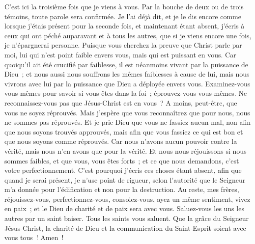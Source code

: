 \begin{multicols}{2}
\VerseOne{}C'est ici la troisième fois que je viens à vous. Par la bouche de deux ou de trois témoins, toute parole sera confirmée.
Je l'ai déjà dit, et je le dis encore comme lorsque j'étais présent pour la seconde fois, et maintenant étant absent, j'écris à ceux qui ont péché auparavant et à tous les autres, que si je viens encore une fois, je n'épargnerai personne.
Puisque vous cherchez la preuve que Christ parle par moi, lui qui n'est point faible envers vous, mais qui est puissant en vous.
Car quoiqu'il ait été crucifié par faiblesse, il est néanmoins vivant par la puissance de Dieu~; et nous aussi nous souffrons les mêmes faiblesses à cause de lui, mais nous vivrons avec lui par la puissance que Dieu a déployée envers vous.
Examinez-vous vous-mêmes pour savoir si vous êtes dans la foi~; éprouvez-vous vous-mêmes. Ne reconnaissez-vous pas que Jésus-Christ est en vous~? A moins, peut-être, que vous ne soyez réprouvés.
Mais j'espère que vous reconnaîtrez que pour nous, nous ne sommes pas réprouvés.
Et je prie Dieu que vous ne fassiez aucun mal, non afin que nous soyons trouvés approuvés, mais afin que vous fassiez ce qui est bon et que nous soyons comme réprouvés.
Car nous n'avons aucun pouvoir contre la vérité, mais nous n'en avons que pour la vérité.
Et nous nous réjouissons si nous sommes faibles, et que vous, vous êtes forts~; et ce que nous demandons, c'est votre perfectionnement.
C'est pourquoi j'écris ces choses étant absent, afin que quand je serai présent, je n'use point de rigueur, selon l'autorité que le Seigneur m'a donnée pour l'édification et non pour la destruction.
Au reste, mes frères, réjouissez-vous, perfectionnez-vous, consolez-vous, ayez un même sentiment, vivez en paix~; et le Dieu de charité et de paix sera avec vous.
Saluez-vous les uns les autres par un saint baiser. Tous les saints vous saluent.
Que la grâce du Seigneur Jésus-Christ, la charité de Dieu et la communication du Saint-Esprit soient avec vous tous~! Amen~!
\PPE{}
\end{multicols}
